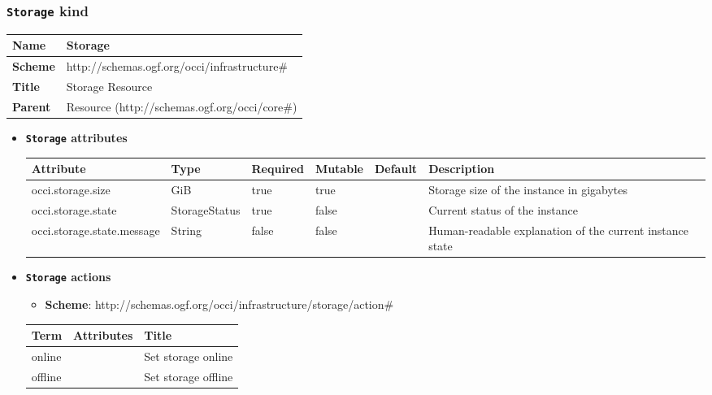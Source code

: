 \subsubsection{\texttt{Storage} kind}
\begin{center}
\begin{tabular}{|l|l|}
  \hline
  \textbf{Name} & Storage \\
  \hline  
  \textbf{Scheme} & http://schemas.ogf.org/occi/infrastructure\# \\
  \hline
  \textbf{Title} & Storage Resource \\
  \hline
  \textbf{Parent} & Resource (http://schemas.ogf.org/occi/core\#) \\
  \hline
\end{tabular}
\end{center}
\begin{itemize}
\item \textbf{\texttt{Storage} attributes}

\begin{tabularx}{\textwidth}{|l|l|p{1.4cm}|p{1.3cm}|l|X|}
  \hline
  \textbf{Attribute} & \textbf{Type} & \textbf{Required} & \textbf{Mutable} & \textbf{Default} & \textbf{Description} \\
  \hline  
  occi.storage.size & GiB & true & true &  & Storage size of the instance in gigabytes \\
  \hline
  occi.storage.state & StorageStatus & true & false &  & Current status of the instance \\
  \hline
  occi.storage.state.message & String & false & false &  & Human-readable explanation of the current instance state \\
  \hline
\end{tabularx}
\end{itemize}

\begin{itemize}
\item \textbf{\texttt{Storage} actions}

\begin{itemize}
	\item \textbf{Scheme}: http://schemas.ogf.org/occi/infrastructure/storage/action\#
\end{itemize}

\begin{center}
\begin{tabular}{|l|l|l|}
  \hline
  \textbf{Term}  & \textbf{Attributes} & \textbf{Title} \\
  \hline  
  online & & Set storage online \\
  \hline
  offline & & Set storage offline \\
  \hline
\end{tabular}
\end{center}
\end{itemize}

